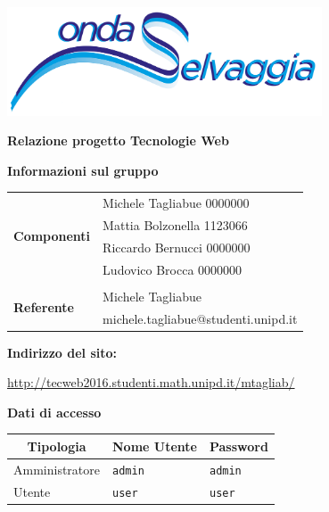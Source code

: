

	
 	\begin{titlepage} 
 		\centering
 		\includegraphics[width=0.70\textwidth]{images/new_logo_min.png}\par\vspace{1cm}
 		{\LARGE\textbf{Relazione progetto Tecnologie Web}}\vspace{2cm}
 		
 		{\large\textbf{Informazioni sul gruppo}}\vspace{0.5cm}
 	
 		\begin{tabular}{l | l@{}}
 			\multirow{4}{*}{\textbf{Componenti}}&Michele Tagliabue 0000000\\
 		
 			&Mattia Bolzonella 1123066\\
 			&Riccardo Bernucci 0000000\\
 			&Ludovico Brocca 0000000\\
 			&\\
 			\multirow{2}{*}{\textbf{Referente}}&Michele Tagliabue\\
 			&michele.tagliabue@studenti.unipd.it\\
 		\end{tabular}\vspace{1.2cm}
 	 		
 	 	{\large\textbf{Indirizzo del sito: }}
 	 
 		{\large \url{http://tecweb2016.studenti.math.unipd.it/mtagliab/}}
 		\vspace{2cm}
 		
 		\textbf{Dati di accesso}
 	
 		\begin{tabular}{| l | l | l |}	
 			\hline
 			\multicolumn{1}{|c|}{\bfseries Tipologia} & \multicolumn{1}{c}{\bfseries Nome Utente} & \multicolumn{1}{|c|}{\bfseries Password} \\
 			\hline
 			Amministratore&\texttt{admin}&\texttt{admin}\\
 			Utente&\texttt{user}&\texttt{user}\\
 			\hline
 		\end{tabular}
	\end{titlepage}
	\newpage
	\tableofcontents
	
	
